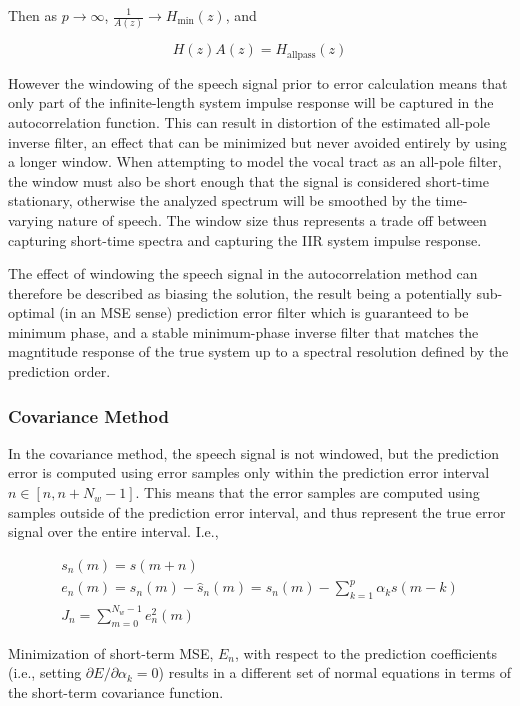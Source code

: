 \noindent
Then as $p \rightarrow \infty$, $\frac{1}{A(z)} \rightarrow H_{\mathrm{min}}(z)$, and

\begin{equation}
	H(z) A(z) = H_{\mathrm{allpass}}(z) 
\end{equation}

However the windowing of the speech signal prior to error calculation means that only part of the infinite-length system impulse response will be captured in the autocorrelation function. This can result in distortion of the estimated all-pole inverse filter, an effect that can be minimized but never avoided entirely by using a longer window. When attempting to model the vocal tract as an all-pole filter, the window must also be short enough that the signal is considered short-time stationary, otherwise the analyzed spectrum will be smoothed by the time-varying nature of speech. The window size thus represents a trade off between capturing short-time spectra and capturing the IIR system impulse response. 

The effect of windowing the speech signal in the autocorrelation method can therefore be described as biasing the solution, the result being a potentially sub-optimal (in an MSE sense) prediction error filter which is guaranteed to be minimum phase, and a stable minimum-phase inverse filter that matches the magntitude response of the true system up to a spectral resolution defined by the prediction order.


\subsubsection{Covariance Method} \label{lp_cov}

In the covariance method, the speech signal is not windowed, but the prediction error is computed using error samples only within the prediction error interval $n \in [n, n+N_w-1]$. This means that the error samples are computed using samples outside of the prediction error interval, and thus represent the true error signal over the entire interval. I.e.,

\begin{eqnarray}
	s_n(m) = s(m+n) \\
	e_n(m) = s_n(m) - \hat{s}_n(m) = s_n(m) - \sum_{k=1}^{p} \alpha_k s(m-k) \\
	J_n = \sum_{m=0}^{N_w-1} e_n^2(m) \label{eq:cov_tse}
\end{eqnarray}

 Minimization of short-term MSE, $E_n$, with respect to the prediction coefficients (i.e., setting $\partial E/\partial \alpha_k=0$) results in a different set of normal equations in terms of the short-term covariance function. 
 
